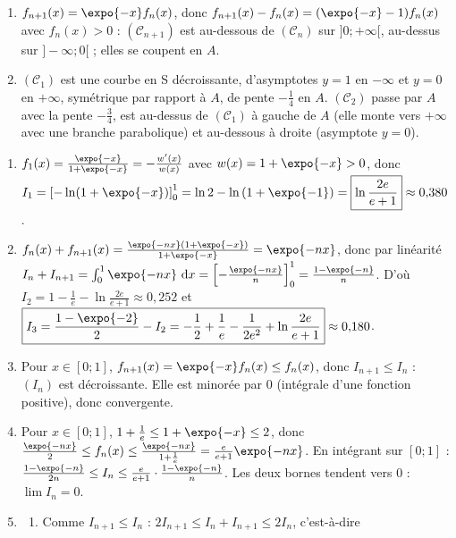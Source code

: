 \begin{corrige}
\begin{sol}
\begin{description}
\begin{enumerate}
      \item $f_{n+1}(x) = \expo{-x} f_n(x)$, donc $f_{n+1}(x) - f_n(x) = (\expo{-x} - 1)f_n(x)$ avec $f_n(x) > 0$ :
            $(\mathscr{C}_{n+1})$ est au-dessous de $(\mathscr{C}_n)$ sur $]0 ; +\infty[$, au-dessus sur $]-\infty ; 0[$ ; elles se coupent en $A$.
      \item $(\mathscr{C}_1)$ est une courbe en S d\'ecroissante, d'asymptotes $y = 1$ en $-\infty$ et $y = 0$ en $+\infty$,
            sym\'etrique par rapport \`a $A$, de pente $-\frac{1}{4}$ en $A$.
            $(\mathscr{C}_2)$ passe par $A$ avec la pente $-\frac{3}{4}$, est au-dessus de $(\mathscr{C}_1)$ \`a gauche de $A$
            (elle monte vers $+\infty$ avec une branche parabolique) et au-dessous \`a droite (asymptote $y = 0$).
      \end{enumerate}
\item[Partie B.] \begin{enumerate}
      \item $f_1(x) = \frac{\expo{-x}}{1 + \expo{-x}} = -\frac{w'(x)}{w(x)}$ avec $w(x) = 1 + \expo{-x} > 0$, donc
            $I_1 = \left[ -\ln(1 + \expo{-x}) \right]_0^1 = \ln 2 - \ln\left( 1 + \expo{-1} \right) = \boxed{\ln\frac{2e}{e+1}} \approx 0{,}380$.
      \item $f_n(x) + f_{n+1}(x) = \frac{\expo{-nx}(1 + \expo{-x})}{1 + \expo{-x}} = \expo{-nx}$, donc par lin\'earit\'e
            $I_n + I_{n+1} = \int_0^1 \expo{-nx}\dx = \left[ -\frac{\expo{-nx}}{n} \right]_0^1 = \frac{1 - \expo{-n}}{n}$.
            D'o\`u $\boxed{I_2 = 1 - \frac{1}{e} - \ln\frac{2e}{e+1}} \approx 0{,}252$ et
            $\boxed{I_3 = \frac{1 - \expo{-2}}{2} - I_2 = -\frac{1}{2} + \frac{1}{e} - \frac{1}{2e^2} + \ln\frac{2e}{e+1}} \approx 0{,}180$.
      \item Pour $x \in [0 ; 1]$, $f_{n+1}(x) = \expo{-x}f_n(x) \leq f_n(x)$, donc $I_{n+1} \leq I_n$ : $(I_n)$ est d\'ecroissante.
            Elle est minor\'ee par $0$ (int\'egrale d'une fonction positive), donc convergente.
      \item Pour $x \in [0 ; 1]$, $1 + \frac{1}{e} \leq 1 + \expo{-x} \leq 2$, donc
            $\frac{\expo{-nx}}{2} \leq f_n(x) \leq \frac{\expo{-nx}}{1 + \frac{1}{e}} = \frac{e}{e+1}\expo{-nx}$.
            En int\'egrant sur $[0 ; 1]$ : $\frac{1 - \expo{-n}}{2n} \leq I_n \leq \frac{e}{e+1}\cdot\frac{1 - \expo{-n}}{n}$.
            Les deux bornes tendent vers $0$ : $\boxed{\lim I_n = 0}$.
      \item \begin{enumerate}
            \item Comme $I_{n+1} \leq I_n$ : $2I_{n+1} \leq I_n + I_{n+1} \leq 2I_n$, c'est-\`a-dire

\end{enumerate}
\end{enumerate}
\end{description}
\end{sol}
\end{corrige}
